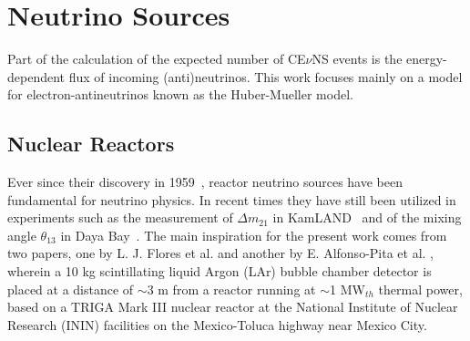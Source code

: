 \section{Neutrino Sources}
Part of the calculation of the expected number of CE$\nu$NS events is the energy-dependent flux of incoming (anti)neutrinos. This work focuses mainly on a model for electron-antineutrinos known as the Huber-Mueller model.
\subsection{Nuclear Reactors}
Ever since their discovery in 1959~\cite{doi:10.1126/science.124.3212.103}, reactor neutrino sources have been fundamental for neutrino physics. In recent times they have still been utilized in experiments such as the measurement of $\Delta m_{21}$ in KamLAND~\cite{Aliani_2004} and of the mixing angle $\theta_{13}$ in Daya Bay~\cite{dayabaycollaboration2007precision}. The main inspiration for the present work comes from two papers, one by L. J. Flores et al. \cite{Flores_2021} and another by E. Alfonso-Pita et al. \cite{Alfonso_Pita_2022}, wherein a 10 kg scintillating liquid Argon (LAr) bubble chamber detector is placed at a distance of $\sim$3 m from a reactor running at $\sim$1 MW$_{th}$ thermal power, based on a TRIGA Mark III nuclear reactor at the National Institute of Nuclear Research (ININ) facilities on the Mexico-Toluca highway near Mexico City.

